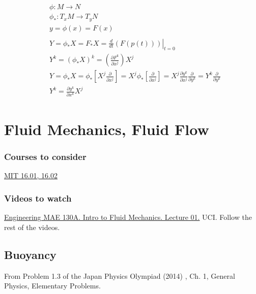 \documentclass[10pt]{amsart}
\begin{document}
\begin{multicols*}{2}
\[
\begin{gathered}
	\begin{aligned}
	& \phi : M \to N \\
	& \phi_* : T_xM \to T_y N \\
	& y = \phi(x) = F(x)
	\end{aligned} \\
\begin{aligned} 
& Y = \phi_* X = F_* X = \left. \frac{d}{dt} (F(p(t))) \right|_{t=0} \\
& Y^k = (\phi_* X)^k = \left( \frac{ \partial F^k }{ \partial x^j } \right) X^j \\
& Y = \phi_* X = \phi_* \left[ X^j \frac{ \partial }{ \partial x^j } \right] = X^j \phi_* \left[ \frac{ \partial }{ \partial x^j } \right] = X^j \frac{ \partial y^k}{ \partial x^j} \frac{ \partial }{ \partial y^k } = Y^k \frac{ \partial }{ \partial y^k } \\
& Y^k  = \frac{ \partial y^k }{ \partial x^k } X^j
\end{aligned} 
\end{gathered}
\]


\section{Fluid Mechanics, Fluid Flow}

\subsubsection{Courses to consider}

\href{https://ocw.mit.edu/courses/aeronautics-and-astronautics/16-01-unified-engineering-i-ii-iii-iv-fall-2005-spring-2006/fluid-mechanics/}{MIT 16.01, 16.02}

\subsubsection{Videos to watch}

\href{https://youtu.be/pAuQ4Hj2ZrU}{Engineering MAE 130A. Intro to Fluid Mechanics. Lecture 01.} UCI. Follow the rest of the videos.


\subsection{Buoyancy}

From Problem 1.3 of the Japan Physics Olympiad (2014) \cite{Japa2014}, Ch. 1, General Physics, Elementary Problems.


\end{multicols*}
\end{document}
